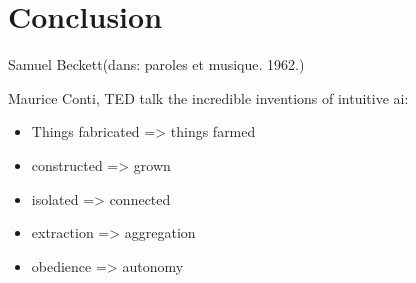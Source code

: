 %
\chapter{Conclusion}
\label{ch:conclusion}

{Samuel Beckett}{(dans: paroles et musique. 1962.)}

Maurice Conti, TED talk the incredible inventions of intuitive ai:
\vspace{-1em}
\begin{itemize}[noitemsep]
	\item Things fabricated => things farmed
	\item constructed => grown
	\item isolated => connected
	\item extraction => aggregation
	\item obedience => autonomy
\end{itemize}
